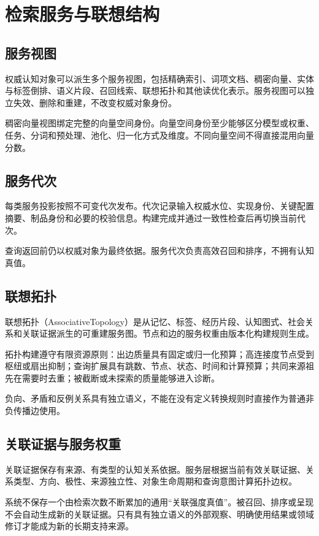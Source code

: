 \chapter{检索服务与联想结构}

\section{服务视图}

权威认知对象可以派生多个服务视图，包括精确索引、词项文档、稠密向量、实体与标签倒排、语义片段、召回线索、联想拓扑和其他读优化表示。服务视图可以独立失效、删除和重建，不改变权威对象身份。

稠密向量视图绑定完整的向量空间身份。向量空间身份至少能够区分模型或权重、任务、分词和预处理、池化、归一化方式及维度。不同向量空间不得直接混用向量分数。

\section{服务代次}

每类服务投影按照不可变代次发布。代次记录输入权威水位、实现身份、关键配置摘要、制品身份和必要的校验信息。构建完成并通过一致性检查后再切换当前代次。

查询返回前仍以权威对象为最终依据。服务代次负责高效召回和排序，不拥有认知真值。

\section{联想拓扑}

联想拓扑（AssociativeTopology）是从记忆、标签、经历片段、认知图式、社会关系和关联证据派生的可重建服务图。节点和边的服务权重由版本化构建规则生成。

拓扑构建遵守有限资源原则：出边质量具有固定或归一化预算；高连接度节点受到枢纽或扇出抑制；查询扩展具有跳数、节点、状态、时间和计算预算；共同来源祖先在需要时去重；被截断或未探索的质量能够进入诊断。

负向、矛盾和反例关系具有独立语义，不能在没有定义转换规则时直接作为普通非负传播边使用。

\section{关联证据与服务权重}

关联证据保存有来源、有类型的认知关系依据。服务层根据当前有效关联证据、关系类型、方向、极性、来源独立性、对象生命周期和查询意图计算拓扑边权。

系统不保存一个由检索次数不断累加的通用“关联强度真值”。被召回、排序或呈现不会自动生成新的关联证据。只有具有独立语义的外部观察、明确使用结果或领域修订才能成为新的长期支持来源。
